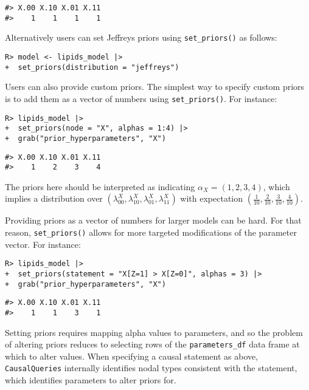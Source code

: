 \documentclass[
  11pt,
  article]{jss}
\begin{document}
\begin{verbatim}
#> X.00 X.10 X.01 X.11 
#>    1    1    1    1
\end{verbatim}

Alternatively users can set Jeffreys priors using \texttt{set\_priors()}
as follows:

\begin{verbatim}
R> model <- lipids_model |> 
+  set_priors(distribution = "jeffreys")
\end{verbatim}

Users can also provide custom priors. The simplest way to specify custom
priors is to add them as a vector of numbers using
\texttt{set\_priors()}. For instance:

\begin{verbatim}
R> lipids_model |> 
+  set_priors(node = "X", alphas = 1:4) |> 
+  grab("prior_hyperparameters", "X")
\end{verbatim}

\begin{verbatim}
#> X.00 X.10 X.01 X.11 
#>    1    2    3    4
\end{verbatim}

The priors here should be interpreted as indicating
\(\alpha_X = (1,2, 3, 4)\), which implies a distribution over
\((\lambda^X_{00},\lambda^X_{10}, \lambda^X_{01}, \lambda^X_{11})\) with
expectation
\(\left(\frac1{10}, \frac2{10}, \frac3{10}, \frac4{10} \right)\).

Providing priors as a vector of numbers for larger models can be hard.
For that reason, \texttt{set\_priors()} allows for more targeted
modifications of the parameter vector. For instance:

\begin{verbatim}
R> lipids_model |>
+  set_priors(statement = "X[Z=1] > X[Z=0]", alphas = 3) |>
+  grab("prior_hyperparameters", "X")
\end{verbatim}

\begin{verbatim}
#> X.00 X.10 X.01 X.11 
#>    1    1    3    1
\end{verbatim}

Setting priors requires mapping alpha values to parameters, and so the
problem of altering priors reduces to selecting rows of the
\texttt{parameters\_df} data frame at which to alter values. When
specifying a causal statement as above, \texttt{CausalQueries}
internally identifies nodal types consistent with the statement, which
identifies parameters to alter priors for.
\end{document}
